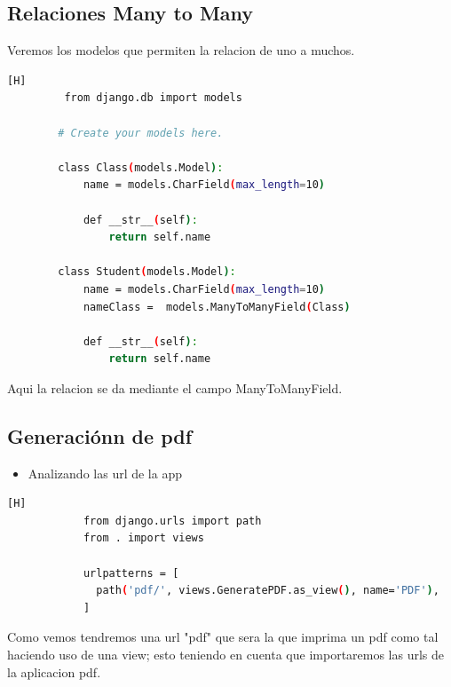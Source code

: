 \documentclass{article}
\begin{document}
        \subsection{Relaciones Many to Many}
        Veremos los modelos que permiten la relacion de uno a muchos.

        \begin{lstlisting}[language=bash,caption={models.py de la app}][H]
         from django.db import models
        
        # Create your models here.
        
        class Class(models.Model):
            name = models.CharField(max_length=10)
        
            def __str__(self):
                return self.name
            
        class Student(models.Model):
            name = models.CharField(max_length=10)
            nameClass =  models.ManyToManyField(Class)
        
            def __str__(self):
                return self.name
	\end{lstlisting}
        Aqui la relacion se da mediante  el campo ManyToManyField.
        
        \subsection{Generaciónn de pdf}
        
        \begin{itemize}
            \item Analizando las url de la app
        \end{itemize}
        \begin{lstlisting}[language=bash,caption={Archivo urls.py}][H]
            from django.urls import path
            from . import views
            
            urlpatterns = [
              path('pdf/', views.GeneratePDF.as_view(), name='PDF'),
            ]
	\end{lstlisting}
        Como vemos tendremos una url "pdf" que sera la que imprima un pdf como tal haciendo uso de una view; esto teniendo en cuenta que importaremos las urls de la aplicacion pdf.
\end{document}
